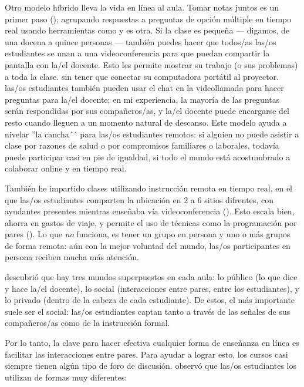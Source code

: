 Otro modelo híbrido lleva la vida en línea al aula.
Tomar notas juntos es un primer paso ();
agrupando respuestas a preguntas de opción múltiple en tiempo real
usando herramientas como 
y  es otra.
Si la clase es pequeña --- digamos, de una docena a quince personas --- también puedes
hacer que todos/as las/os estudiantes se unan a una videoconferencia
para que puedan compartir la pantalla con la/el docente.
Esto les permite mostrar su trabajo (o sus problemas) a toda la clase.
sin tener que conectar su computadora portátil al proyector.
las/os estudiantes también pueden usar el chat en la videollamada para hacer preguntas para la/el docente;
en mi experiencia,
la mayoría de las preguntas serán respondidas por sus compañeros/as,
y la/el docente puede encargarse del resto cuando lleguen a un momento natural de descanso.
Este modelo ayuda a nivelar ''la cancha´´ para las/os estudiantes remotos:
si alguien no puede asistir a clase por razones de salud
o por compromisos familiares o laborales,
todavía puede participar casi en pie de igualdad,
si todo el mundo está acostumbrado a colaborar online y en tiempo real.

También he impartido clases utilizando instrucción remota en tiempo real,
en el que las/os estudiantes comparten la ubicación en 2 a 6 sitios difrentes, con ayudantes presentes
mientras enseñaba vía videoconferencia ().
Esto escala bien,
ahorra en gastos de viaje,
y permite el uso de técnicas como la programación por pares ().
Lo que \emph{no} funciona, es tener un grupo en persona y uno o más grupos de forma remota:
aún con la mejor voluntad del mundo,
las/os participantes en persona reciben mucha más atención.


\cite{Nuth2007} descubrió que hay tres mundos superpuestos en cada aula:
lo público (lo que dice y hace la/el docente),
lo social (interacciones entre pares, entre los estudiantes),
y lo privado (dentro de la cabeza de cada estudiante).
De estos,
el más importante suele ser el social:
las/os estudiantes captan tanto a través de las señales de sus compañeros/as como de la instrucción formal.

Por lo tanto, la clave para hacer efectiva cualquier forma de enseñanza en línea es
facilitar las interacciones entre pares.
Para ayudar a lograr esto,
los cursos casi siempre tienen algún tipo de foro de discusión.
\cite{Mill2016a} observó que las/os estudiantes los utilizan de formas muy diferentes:

